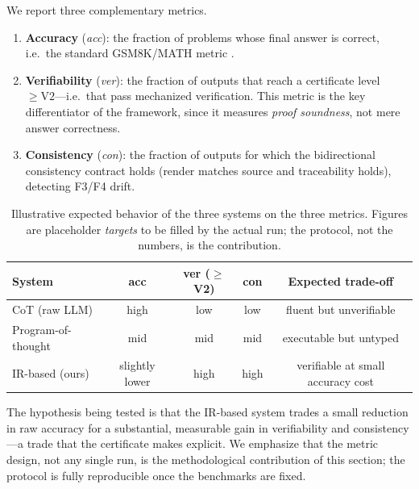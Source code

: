 \documentclass[11pt,a4paper]{article}
\theoremstyle{definition}
\theoremstyle{plain}
\begin{document}
We report three complementary metrics.
\begin{enumerate}[leftmargin=*]
  \item \textbf{Accuracy} (\emph{acc}): the fraction of problems whose final answer is correct, i.e.\ the
  standard GSM8K/MATH metric \cite{cobbe2021,hendrycks2021}.
  \item \textbf{Verifiability} (\emph{ver}): the fraction of outputs that reach a certificate level
  $\geq \mathrm{V2}$---i.e.\ that pass mechanized verification. This metric is the key differentiator of
  the framework, since it measures \emph{proof soundness}, not mere answer correctness.
  \item \textbf{Consistency} (\emph{con}): the fraction of outputs for which the bidirectional
  consistency contract holds (render matches source and traceability holds), detecting F3/F4 drift.
\end{enumerate}

\begin{table}[t]
\centering
\caption{Illustrative expected behavior of the three systems on the three metrics. Figures are
placeholder \emph{targets} to be filled by the actual run; the protocol, not the numbers, is the
contribution.}
\label{tab:metrics}
\small
\begin{tabular}{@{}l c c c c@{}}
\toprule
\textbf{System} & \textbf{acc} & \textbf{ver} ($\geq$V2) & \textbf{con} & \textbf{Expected trade-off}\\
\midrule
CoT (raw LLM) & high & low & low & fluent but unverifiable\\
Program-of-thought & mid & mid & mid & executable but untyped\\
IR-based (ours) & slightly lower & high & high & verifiable at small accuracy cost\\
\bottomrule
\end{tabular}
\end{table}

The hypothesis being tested is that the IR-based system trades a small reduction in raw accuracy for a
substantial, measurable gain in verifiability and consistency---a trade that the certificate makes
explicit. We emphasize that the metric design, not any single run, is the methodological contribution of
this section; the protocol is fully reproducible once the benchmarks are fixed.

\end{document}
